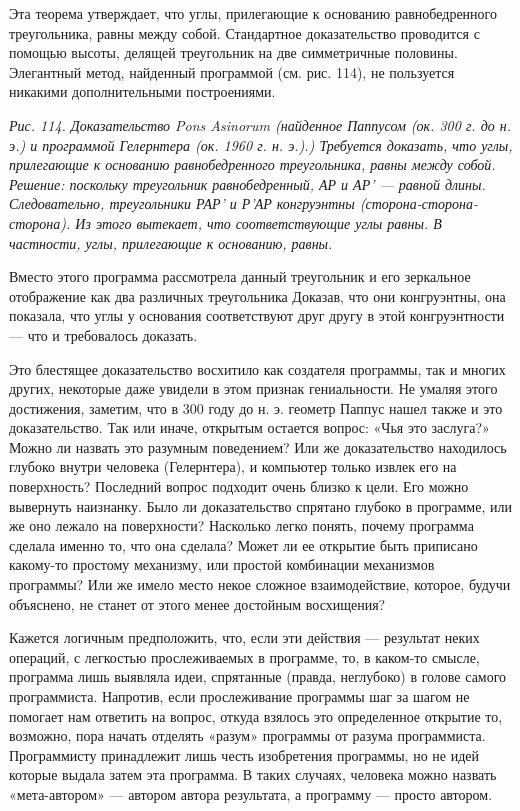 Эта теорема утверждает, что углы, прилегающие к основанию равнобедренного треугольника, равны между собой. Стандартное доказательство проводится с помощью высоты, делящей треугольник на две симметричные половины. Элегантный метод, найденный программой (см. рис. 114), не пользуется никакими дополнительными построениями.

\emph{Рис. 114. Доказательство Pons Asinorum (найденное Паппусом (ок. 300 г. до н. э.) и программой Гелернтера (ок. 1960 г. н. э.).) Требуется доказать, что углы, прилегающие к основанию равнобедренного треугольника, равны между собой. Решение: поскольку треугольник равнобедренный, АР и АР' --- равной длины. Следовательно, треугольники РАР' и Р'АР конгруэнтны (сторона-сторона-сторона). Из этого вытекает, что соответствующие углы равны. В частности, углы, прилегающие к основанию, равны.}

Вместо этого программа рассмотрела данный треугольник и его зеркальное отображение как два различных треугольника Доказав, что они конгруэнтны, она показала, что углы у основания соответствуют друг другу в этой конгруэнтности --- что и требовалось доказать.

Это блестящее доказательство восхитило как создателя программы, так и многих других, некоторые даже увидели в этом признак гениальности. Не умаляя этого достижения, заметим, что в 300 году до н. э. геометр Паппус нашел также и это доказательство. Так или иначе, открытым остается вопрос: «Чья это заслуга?» Можно ли назвать это разумным поведением? Или же доказательство находилось глубоко внутри человека (Гелернтера), и компьютер только извлек его на поверхность? Последний вопрос подходит очень близко к цели. Его можно вывернуть наизнанку. Было ли доказательство спрятано глубоко в программе, или же оно лежало на поверхности? Насколько легко понять, почему программа сделала именно то, что она сделала? Может ли ее открытие быть приписано какому-то простому механизму, или простой комбинации механизмов программы? Или же имело место некое сложное взаимодействие, которое, будучи объяснено, не станет от этого менее достойным восхищения?

Кажется логичным предположить, что, если эти действия --- результат неких операций, с легкостью прослеживаемых в программе, то, в каком-то смысле, программа лишь выявляла идеи, спрятанные (правда, неглубоко) в голове самого программиста. Напротив, если прослеживание программы шаг за шагом не помогает нам ответить на вопрос, откуда взялось это определенное открытие то, возможно, пора начать отделять «разум» программы от разума программиста. Программисту принадлежит лишь честь изобретения программы, но не идей которые выдала затем эта программа. В таких случаях, человека можно назвать «мета-автором» --- автором автора результата, а программу --- просто автором.

